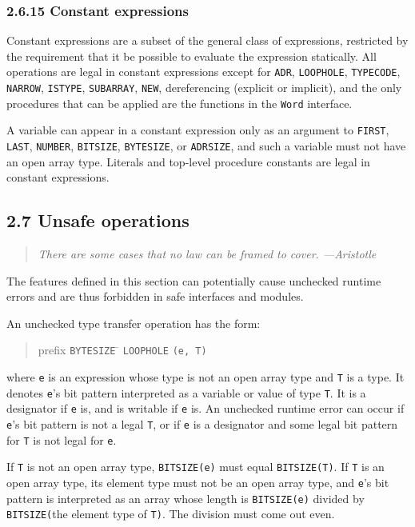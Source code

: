 \documentclass[10pt]{article}
\begin{document}
\subsubsection*{2.6.15 Constant expressions}

Constant expressions are a subset of the general class of expressions,
restricted by the requirement that it be possible to evaluate the expression
statically.  All operations are legal in constant expressions except for
\verb|ADR|, \verb|LOOPHOLE|, \verb|TYPECODE|, \verb|NARROW|, \verb|ISTYPE|,
\verb|SUBARRAY|, \verb|NEW|, dereferencing (explicit or implicit), and the
only procedures that can be applied are the functions in the \verb|Word|
interface.

A variable can appear in a constant expression only as an argument to
\verb|FIRST|, \verb|LAST|, \verb|NUMBER|, \verb|BITSIZE|, \verb|BYTESIZE|, or
\verb|ADRSIZE|, and such a variable must not have an open array type.
Literals and top-level procedure constants are legal in constant expressions.

\subsection*{2.7 Unsafe operations}

\begin{quote}
  \emph{There are some cases that no law can be framed to cover.
    ---Aristotle}
\end{quote}

The features defined in this section can potentially cause unchecked runtime
errors and are thus forbidden in safe interfaces and modules.

An unchecked type transfer operation has the form:
\begin{quote}
  \begin{tabbing}
    prefix \= \verb|BYTESIZE| \= \kill
    \> \verb|LOOPHOLE| \> \verb|(e, T)|
  \end{tabbing}
\end{quote}
where \verb|e| is an expression whose type is not an open array type and
\verb|T| is a type.  It denotes \verb|e|'s bit pattern interpreted as a
variable or value of type \verb|T|.  It is a designator if \verb|e| is, and is
writable if \verb|e| is.  An unchecked runtime error can occur if \verb|e|'s
bit pattern is not a legal \verb|T|, or if \verb|e| is a designator and some
legal bit pattern for \verb|T| is not legal for \verb|e|.

If \verb|T| is not an open array type, \verb|BITSIZE(e)| must equal
\verb|BITSIZE(T)|.  If \verb|T| is an open array type, its element type must
not be an open array type, and \verb|e|'s bit pattern is interpreted as an
array whose length is \verb|BITSIZE(e)| divided by \verb|BITSIZE(|the element
type of \verb|T)|.  The division must come out even.
\end{document}
